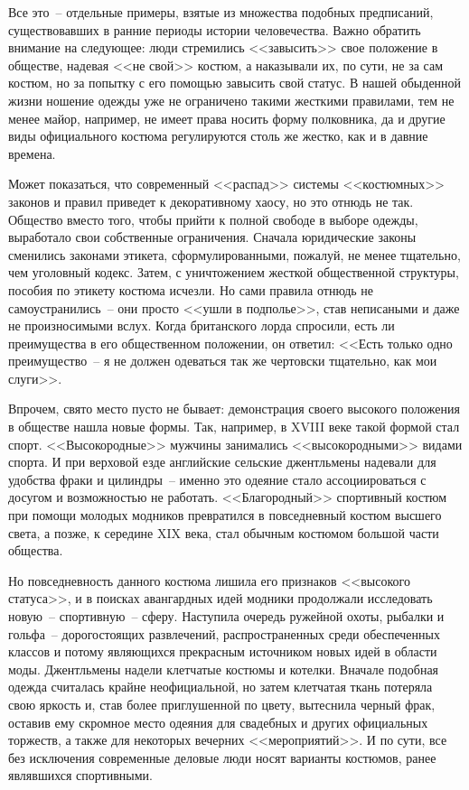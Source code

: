   Все это~-- отдельные примеры, взятые из множества подобных предписаний,
  существовавших в ранние периоды истории человечества. Важно обратить внимание
  на следующее: люди стремились <<завысить>> свое положение в обществе, надевая
  <<не свой>> костюм, а наказывали их, по сути, не за сам костюм, но за попытку
  с его помощью завысить свой статус. В нашей обыденной жизни ношение одежды уже
  не ограничено такими жесткими правилами, тем не менее майор, например, не
  имеет права носить форму полковника, да и другие виды официального костюма
  регулируются столь же жестко, как и в давние времена.
  
  Может показаться, что современный <<распад>> системы <<костюмных>> законов и
  правил приведет к декоративному хаосу, но это отнюдь не так. Общество вместо
  того, чтобы прийти к полной свободе в выборе одежды, выработало свои
  собственные ограничения. Сначала юридические законы сменились законами
  этикета, сформулированными, пожалуй, не менее тщательно, чем уголовный
  кодекс. Затем, с уничтожением жесткой общественной структуры, пособия по
  этикету костюма исчезли. Но сами правила отнюдь не самоустранились~-- они
  просто <<ушли в подполье>>, став неписаными и даже не произносимыми вслух.
  Когда британского лорда спросили, есть ли преимущества в его общественном
  положении, он ответил: <<Есть только одно преимущество~-- я не должен
  одеваться так же чертовски тщательно, как мои слуги>>.
  
  Впрочем, свято место пусто не бывает: демонстрация своего высокого положения
  в обществе нашла новые формы. Так, например, в XVIII веке такой формой
  стал спорт. <<Высокородные>> мужчины занимались <<высокородными>> видами
  спорта. И при верховой езде английские сельские джентльмены надевали для
  удобства фраки и цилиндры~-- именно это одеяние стало ассоциироваться с
  досугом и возможностью не работать. <<Благородный>> спортивный костюм при
  помощи молодых модников превратился в повседневный костюм высшего света, а
  позже, к середине XIX века, стал обычным костюмом большой части
  общества.
  
  Но повседневность данного костюма лишила его признаков <<высокого статуса>>,
  и в поисках авангардных идей модники продолжали исследовать новую~--
  спортивную~-- сферу. Наступила очередь ружейной охоты, рыбалки и гольфа~--
  дорогостоящих развлечений, распространенных среди обеспеченных классов и
  потому являющихся прекрасным источником новых идей в области моды.
  Джентльмены надели клетчатые костюмы и котелки. Вначале подобная одежда
  считалась крайне неофициальной, но затем клетчатая ткань потеряла свою
  яркость и, став более приглушенной по цвету, вытеснила черный фрак, оставив
  ему скромное место одеяния для свадебных и других официальных торжеств, а
  также для некоторых вечерних <<мероприятий>>. И по сути, все без исключения
  современные деловые люди носят варианты костюмов, ранее являвшихся
  спортивными.
  
